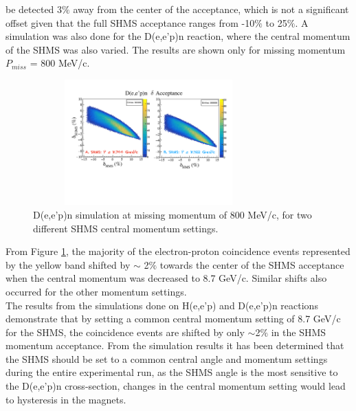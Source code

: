 \documentclass[letterpaper, 12 pt, conference]{ieeeconf}  %
\begin{document}
be detected $3\%$ away from the center of the acceptance, which is not a significant offset given that the
full SHMS acceptance ranges from -10$\%$ to 25$\%$.
\indent A simulation was also done for the D(e,e'p)n reaction, where the central momentum of the SHMS was
also varied. The results are shown only for missing momentum $P_{miss}$ = 800 MeV/c.
\begin{figure}[h!]
  \centering
  \includegraphics[width=3.5in, height=1.9in]{deut_kin/d2_acceptance.pdf}
  \caption{D(e,e'p)n simulation at missing momentum of 800 MeV/c, for two different SHMS central momentum settings.}
  \label{fig:deut_pmiss800}
\end{figure}
\indent From Figure \ref{fig:deut_pmiss800}, the majority of the electron-proton coincidence events represented by the yellow band
shifted by $\sim$ 2$\%$ towards the center of the SHMS acceptance when the central momentum was decreased to 8.7 GeV/c. Similar shifts
also occurred for the other momentum settings. \\
\indent The results from the simulations done on H(e,e'p) and D(e,e'p)n reactions demonstrate that by setting a common central momentum setting
of 8.7 GeV/c for the SHMS, the coincidence events are shifted by only $\sim$2$\%$ in the SHMS momentum acceptance.
\indent From the simulation results it has been determined that the SHMS should be set to a common central angle and momentum settings during the
entire experimental run, as the SHMS angle is the most sensitive to the D(e,e'p)n cross-section, changes in the central momentum setting would
lead to hysteresis in the magnets\cite{priv_comm}. 


\addtolength{\textheight}{-12cm}   %
\end{document}
